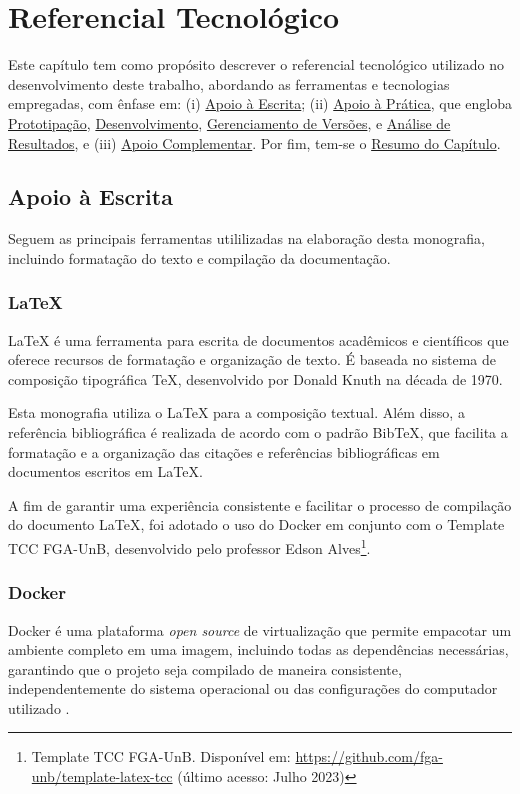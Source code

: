 \chapter[Referencial Tecnológico]{Referencial Tecnológico}
\label{chap:ReferencialTech}

Este capítulo tem como propósito descrever o referencial tecnológico utilizado no desenvolvimento
deste trabalho, abordando as ferramentas e tecnologias empregadas, com ênfase em: (i) \hyperref[sec:Apoio a Escrita]{Apoio à Escrita}; 
(ii) \hyperref[sec:Apoio à Prática]{Apoio à Prática}, que engloba \hyperref[sec:Prototipação]{Prototipação}, \hyperref[sec:Desenvolvimento]{Desenvolvimento}, \hyperref[sec:Gerenciamento de Versões]{Gerenciamento de Versões}, 
e \hyperref[sec:Análise de Resultados]{Análise de Resultados}, e (iii) \hyperref[sec:Apoio Complementar]{Apoio Complementar}. Por fim, tem-se o \hyperref[sec:Resumo do Capítulo]{Resumo do Capítulo}.

\section{Apoio à Escrita}
\label{sec:Apoio a Escrita}
Seguem as principais ferramentas utililizadas na elaboração desta monografia, incluindo formatação do texto e compilação da documentação.

\subsection{LaTeX}
\label{sec:Latex}
LaTeX \cite{latex} é uma ferramenta para escrita de documentos acadêmicos e científicos que oferece 
recursos de formatação e organização de texto. É baseada no sistema de composição tipográfica 
TeX, desenvolvido por Donald Knuth na década de 1970.

Esta monografia utiliza o LaTeX para a composição textual. Além disso, a referência bibliográfica 
é realizada de acordo com o padrão BibTeX, que facilita a formatação e a organização das citações e 
referências bibliográficas em documentos escritos em LaTeX.

A fim de garantir uma experiência consistente e facilitar o processo de compilação do documento LaTeX, foi 
adotado o uso do Docker em conjunto com o Template TCC FGA-UnB, desenvolvido pelo professor 
Edson Alves\footnote{Template TCC FGA-UnB. Disponível
em: \url{https://github.com/fga-unb/template-latex-tcc} (último acesso: Julho 2023)}.

\subsection{Docker}
\label{sec:Docker}
Docker é uma plataforma \textit{open source} de virtualização que permite empacotar um ambiente completo em 
uma imagem, incluindo todas as dependências necessárias, garantindo que o projeto seja 
compilado de maneira consistente, independentemente do sistema operacional ou das configurações do computador   
utilizado \cite{docker}.

